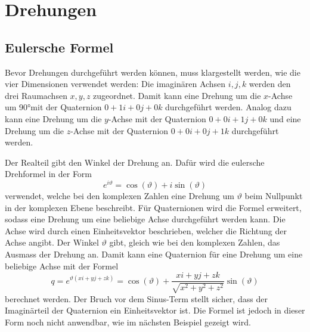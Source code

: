 %
%
%
%

\section{Drehungen\label{qa:section:drehungen}}
\subsection{Eulersche Formel}
Bevor Drehungen durchgeführt werden können, muss klargestellt werden, 
wie die vier Dimensionen verwendet werden: Die imaginären Achsen 
$i,j,k$ werden den drei Raumachsen $x,y,z$ zugeordnet. Damit kann eine 
Drehung um die $x$-Achse um 90°mit der Quaternion $0 + 1i + 0j + 0k$ 
durchgeführt werden. Analog dazu kann eine Drehung um die $y$-Achse 
mit der Quaternion $0 + 0i + 1\!j + 0k$ und eine Drehung um die 
$z$-Achse mit der Quaternion $0 + 0i + 0j + 1k$ durchgeführt werden.

Der Realteil gibt den Winkel der 
Drehung an. Dafür wird die eulersche Drehformel in der Form
%
\begin{equation*}
    e^{i\vartheta} = \cos(\vartheta) + i\sin(\vartheta)
\end{equation*}
verwendet, welche bei den komplexen Zahlen eine Drehung um $\vartheta$ 
beim Nullpunkt in der komplexen Ebene beschreibt. Für Quaternionen 
wird die Formel erweitert, sodass eine Drehung um eine beliebige 
Achse durchgeführt werden kann. Die Achse wird durch einen 
Einheitsvektor beschrieben, welcher die Richtung der Achse angibt. 
Der Winkel $\vartheta$ gibt, gleich wie bei den komplexen Zahlen, 
das Ausmass der Drehung an. Damit kann eine Quaternion für eine 
Drehung um eine beliebige Achse mit der Formel
\begin{equation*}
    q = e^{\vartheta(xi + yj + zk)} 
    = \cos \left(\vartheta\right) 
    + \frac{xi + yj + zk}{\sqrt{x^2 + y^2 + z^2}}\sin\left(\vartheta\right)
\end{equation*}
berechnet werden. Der Bruch vor dem Sinus-Term stellt sicher, dass 
der Imaginärteil der Quaternion ein Einheitsvektor ist. Die Formel 
ist jedoch in dieser Form noch nicht anwendbar, wie im nächsten 
Beispiel gezeigt wird.

